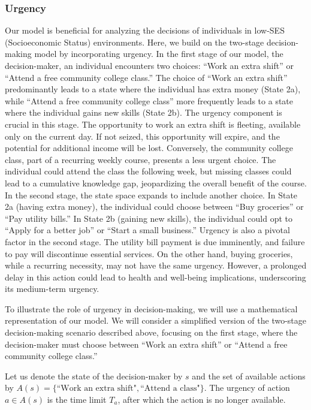 \documentclass[
]{article}
\begin{document}
\hypertarget{urgency}{%
\subsubsection{Urgency}\label{urgency}}

Our model is beneficial for analyzing the decisions of individuals in
low-SES (Socioeconomic Status) environments. Here, we build on the
two-stage decision-making model by incorporating urgency. In the first
stage of our model, the decision-maker, an individual encounters two
choices: ``Work an extra shift'' or ``Attend a free community college
class.'' The choice of ``Work an extra shift'' predominantly leads to a
state where the individual has extra money (State 2a), while ``Attend a
free community college class'' more frequently leads to a state where
the individual gains new skills (State 2b). The urgency component is
crucial in this stage. The opportunity to work an extra shift is
fleeting, available only on the current day. If not seized, this
opportunity will expire, and the potential for additional income will be
lost. Conversely, the community college class, part of a recurring
weekly course, presents a less urgent choice. The individual could
attend the class the following week, but missing classes could lead to a
cumulative knowledge gap, jeopardizing the overall benefit of the
course. In the second stage, the state space expands to include another
choice. In State 2a (having extra money), the individual could choose
between ``Buy groceries'' or ``Pay utility bills.'' In State 2b (gaining
new skills), the individual could opt to ``Apply for a better job'' or
``Start a small business.'' Urgency is also a pivotal factor in the
second stage. The utility bill payment is due imminently, and failure to
pay will discontinue essential services. On the other hand, buying
groceries, while a recurring necessity, may not have the same urgency.
However, a prolonged delay in this action could lead to health and
well-being implications, underscoring its medium-term urgency.

To illustrate the role of urgency in decision-making, we will use a
mathematical representation of our model. We will consider a simplified
version of the two-stage decision-making scenario described above,
focusing on the first stage, where the decision-maker must choose
between ``Work an extra shift'' or ``Attend a free community college
class.''

Let us denote the state of the decision-maker by \(s\) and the set of
available actions by
\(A(s) = \{\text{``Work an extra shift"}, \text{``Attend a class"}\}\).
The urgency of action \(a \in A(s)\) is the time limit \(T_a\), after
which the action is no longer available.
\end{document}
